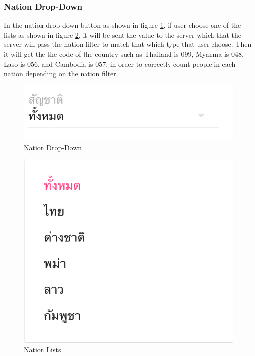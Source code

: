 \subsubsection{Nation Drop-Down}
    In the nation drop-down button as shown in figure \ref{figure-nation-drop-down}, if user choose one of the lists as shown in figure \ref{figure-nation-lists}, it will be sent the value to the server which that the server will pass the nation filter to match that which type that user choose. Then it will get the the code of the country such as Thailand is 099, Myanma is 048, Laso is 056, and Cambodia is 057, in order to correctly count people in each nation depending on the nation filter.
    

    \FloatBarrier
        \begin{figure}[h!]
            \centering
        		\includegraphics[width=\linewidth]{images/chapter-06/nation-1.png}
            	\caption{Nation Drop-Down}
        		\label{figure-nation-drop-down}
        \end{figure}
    \FloatBarrier
    
    \FloatBarrier
        \begin{figure}[h!]
            \centering
        		\includegraphics[width=\linewidth]{images/chapter-06/nation-2.png}
            	\caption{Nation Lists}
        		\label{figure-nation-lists}
        \end{figure}
    \FloatBarrier
    
